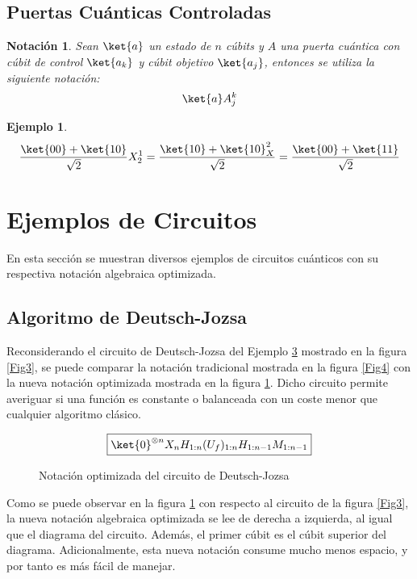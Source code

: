 \documentclass[10pt,conference,a4paper]{IEEEtran}
\newtheorem{notacion}{Notación}[subsection]
\newtheorem{ejemplo}{Ejemplo}
\begin{document}
\subsection{Puertas Cuánticas Controladas}

\begin{notacion}
    Sean $\ket{a}$ un estado de $n$ cúbits y $A$ una puerta cuántica con cúbit de control $\ket{a_k}$ y cúbit objetivo $\ket{a_j}$, entonces se utiliza la siguiente notación:
    \begin{equation}
        \ket{a}A_j^k
    \end{equation}
\end{notacion}

\begin{ejemplo}
\begin{align*}
    \dfrac{\ket{00}+\ket{10}}{\sqrt{2}}X_2^1=\dfrac{\ket{10}+\ket{10}_X^2}{\sqrt{2}}=\dfrac{\ket{00}+\ket{11}}{\sqrt{2}}
\end{align*}
\end{ejemplo}
\vspace{0.35cm}
\section{Ejemplos de Circuitos}
\label{seccion:4}
En esta sección se muestran diversos ejemplos de circuitos cuánticos con su respectiva notación algebraica optimizada.
\subsection{Algoritmo de Deutsch-Jozsa}
Reconsiderando el circuito de Deutsch-Jozsa  del Ejemplo \hyperlink{fig:deutsch-jozsa}{3} mostrado en la figura \ref{Fig3}, se puede comparar la notación tradicional mostrada en la figura \ref{Fig4} con la nueva notación   optimizada mostrada en la figura \ref{Fig5}. Dicho circuito permite averiguar si una función es constante o balanceada con un coste menor que cualquier algoritmo clásico.

 \begin{figure}[htb!]
$$\boxed{\ket{0}^{\otimes n}X_nH_{1:n}(U_{f})_{1:n}H_{1:n-1}M_{1:n-1}}$$
\caption{Notación  optimizada del circuito de Deutsch-Jozsa}
        \label{Fig5} 
\end{figure}


Como se puede observar en la figura \ref{Fig5} con respecto al circuito de la figura \ref{Fig3}, la nueva notación algebraica optimizada se lee de derecha a izquierda, al igual que el diagrama del circuito. Además, el primer cúbit es el cúbit superior del diagrama. Adicionalmente, esta nueva notación consume mucho menos espacio, y por tanto es más fácil de manejar.
\end{document}
